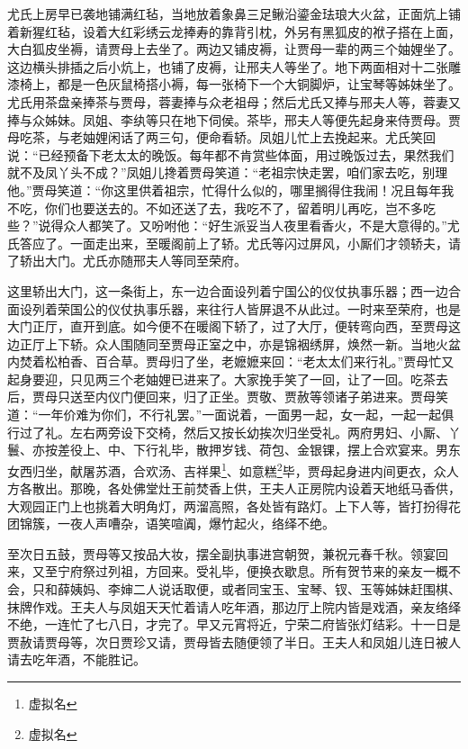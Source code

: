 \documentclass[12pt,oneside]{book}
\begin{document}
尤氏上房早已袭地铺满红毡，当地放着象鼻三足鳅沿鎏金珐琅大火盆，正面炕上铺着新猩红毡，设着大红彩绣云龙捧寿的靠背引枕，外另有黑狐皮的袱子搭在上面，大白狐皮坐褥，请贾母上去坐了。两边又铺皮褥，让贾母一辈的两三个妯娌坐了。这边横头排插之后小炕上，也铺了皮褥，让邢夫人等坐了。地下两面相对十二张雕漆椅上，都是一色灰鼠椅搭小褥，每一张椅下一个大铜脚炉，让宝琴等姊妹坐了。尤氏用茶盘亲捧茶与贾母，蓉妻捧与众老祖母；然后尤氏又捧与邢夫人等，蓉妻又捧与众姊妹。凤姐、李纨等只在地下伺侯。茶毕，邢夫人等便先起身来侍贾母。贾母吃茶，与老妯娌闲话了两三句，便命看轿。凤姐儿忙上去挽起来。尤氏笑回说：“已经预备下老太太的晚饭。每年都不肯赏些体面，用过晚饭过去，果然我们就不及凤丫头不成？”凤姐儿搀着贾母笑道：“老祖宗快走罢，咱们家去吃，别理他。”贾母笑道：“你这里供着祖宗，忙得什么似的，哪里搁得住我闹！况且每年我不吃，你们也要送去的。不如还送了去，我吃不了，留着明儿再吃，岂不多吃些？”说得众人都笑了。又吩咐他：“好生派妥当人夜里看香火，不是大意得的。”尤氏答应了。一面走出来，至暖阁前上了轿。尤氏等闪过屏风，小厮们才领轿夫，请了轿出大门。尤氏亦随邢夫人等同至荣府。

这里轿出大门，这一条街上，东一边合面设列着宁国公的仪仗执事乐器；西一边合面设列着荣国公的仪仗执事乐器，来往行人皆屏退不从此过。一时来至荣府，也是大门正厅，直开到底。如今便不在暖阁下轿了，过了大厅，便转弯向西，至贾母这边正厅上下轿。众人围随同至贾母正室之中，亦是锦裀绣屏，焕然一新。当地火盆内焚着松柏香、百合草。贾母归了坐，老嬷嬷来回：“老太太们来行礼。”贾母忙又起身要迎，只见两三个老妯娌已进来了。大家挽手笑了一回，让了一回。吃茶去后，贾母只送至内仪门便回来，归了正坐。贾敬、贾赦等领诸子弟进来。贾母笑道：“一年价难为你们，不行礼罢。”一面说着，一面男一起，女一起，一起一起俱行过了礼。左右两旁设下交椅，然后又按长幼挨次归坐受礼。两府男妇、小厮、丫鬟、亦按差役上、中、下行礼毕，散押岁钱、荷包、金银锞，摆上合欢宴来。男东女西归坐，献屠苏酒，合欢汤、吉祥果\footnote{虚拟名}、如意糕\footnote{虚拟名}毕，贾母起身进内间更衣，众人方各散出。那晚，各处佛堂灶王前焚香上供，王夫人正房院内设着天地纸马香供，大观园正门上也挑着大明角灯，两溜高照，各处皆有路灯。上下人等，皆打扮得花团锦簇，一夜人声嘈杂，语笑喧阗，爆竹起火，络绎不绝。

至次日五鼓，贾母等又按品大妆，摆全副执事进宫朝贺，兼祝元春千秋。领宴回来，又至宁府祭过列祖，方回来。受礼毕，便换衣歇息。所有贺节来的亲友一概不会，只和薛姨妈、李婶二人说话取便，或者同宝玉、宝琴、钗、玉等姊妹赶围棋、抹牌作戏。王夫人与凤姐天天忙着请人吃年酒，那边厅上院内皆是戏酒，亲友络绎不绝，一连忙了七八日，才完了。早又元宵将近，宁荣二府皆张灯结彩。十一日是贾赦请贾母等，次日贾珍又请，贾母皆去随便领了半日。王夫人和凤姐儿连日被人请去吃年酒，不能胜记。
\end{document}
